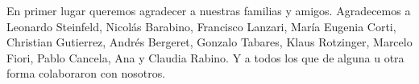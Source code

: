 
\begin{acknowledgments}

En primer lugar queremos agradecer a nuestras familias y amigos. Agradecemos a Leonardo Steinfeld, Nicolás Barabino, Francisco Lanzari, María Eugenia Corti, Christian Gutierrez, Andrés Bergeret, Gonzalo Tabares, Klaus Rotzinger, Marcelo Fiori, Pablo Cancela, Ana y Claudia Rabino. Y a todos los que de alguna u otra forma colaboraron con nosotros.

\end{acknowledgments}